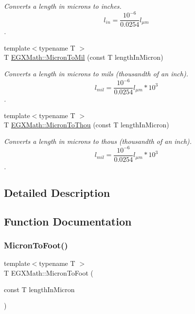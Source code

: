 \begin{DoxyCompactItemize}
\begin{DoxyCompactList}\small\item\em Converts a length in microns to inches. \[ l_{in}= \frac{10^{-6}}{0.0254} l_{\mu m} \]. \end{DoxyCompactList}\item 
{\footnotesize template$<$typename T $>$ }\\T \mbox{\hyperlink{group___e_g_x_math-_conversions-_length_conversions-_non-_s_i-_micron-_imperial_ga691931fc46e3fd33d4e2d83e09fa3db4}{E\+G\+X\+Math\+::\+Micron\+To\+Mil}} (const T length\+In\+Micron)
\begin{DoxyCompactList}\small\item\em Converts a length in microns to mils (thousandth of an inch). \[ l_{mil}= \frac{10^{-6}}{0.0254} l_{\mu m} * 10^{3} \]. \end{DoxyCompactList}\item 
{\footnotesize template$<$typename T $>$ }\\T \mbox{\hyperlink{group___e_g_x_math-_conversions-_length_conversions-_non-_s_i-_micron-_imperial_gaf75a5aad3349d690e8b1bea619fc8706}{E\+G\+X\+Math\+::\+Micron\+To\+Thou}} (const T length\+In\+Micron)
\begin{DoxyCompactList}\small\item\em Converts a length in microns to thous (thousandth of an inch). \[ l_{mil}= \frac{10^{-6}}{0.0254} l_{\mu m} * 10^{3} \]. \end{DoxyCompactList}\end{DoxyCompactItemize}


\subsection{Detailed Description}


\subsection{Function Documentation}
\mbox{\label{group___e_g_x_math-_conversions-_length_conversions-_non-_s_i-_micron-_imperial_gab90a87773543173f5b774b6ccb646b5f}} 
\subsubsection{\texorpdfstring{Micron\+To\+Foot()}{MicronToFoot()}}
{\footnotesize\ttfamily template$<$typename T $>$ \\
T E\+G\+X\+Math\+::\+Micron\+To\+Foot (\begin{DoxyParamCaption}\item[{const T}]{length\+In\+Micron }\end{DoxyParamCaption})}



